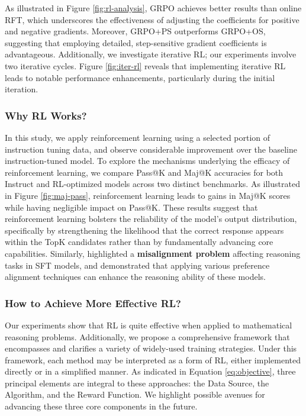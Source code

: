 \begin{itemize}[topsep=0pt]
As illustrated in Figure \ref{fig:rl-analysis}, GRPO achieves better results than online RFT, which underscores the effectiveness of adjusting the coefficients for positive and negative gradients. Moreover, GRPO+PS outperforms GRPO+OS, suggesting that employing detailed, step-sensitive gradient coefficients is advantageous. Additionally, we investigate iterative RL; our experiments involve two iterative cycles. Figure \ref{fig:iter-rl} reveals that implementing iterative RL leads to notable performance enhancements, particularly during the initial iteration.

\subsubsection{Why RL Works?} In this study, we apply reinforcement learning using a selected portion of instruction tuning data, and observe considerable improvement over the baseline instruction-tuned model. To explore the mechanisms underlying the efficacy of reinforcement learning, we compare Pass@K and Maj@K accuracies for both Instruct and RL-optimized models across two distinct benchmarks. As illustrated in Figure \ref{fig:maj-pass}, reinforcement learning leads to gains in Maj@K scores while having negligible impact on Pass@K. These results suggest that reinforcement learning bolsters the reliability of the model’s output distribution, specifically by strengthening the likelihood that the correct response appears within the TopK candidates rather than by fundamentally advancing core capabilities. Similarly, \citep{wang2023making} highlighted a \textbf{misalignment problem} affecting reasoning tasks in SFT models, and demonstrated that applying various preference alignment techniques \citep{yuan2023rrhf,song2023preference,wang2023making} can enhance the reasoning ability of these models.

\subsubsection{How to Achieve More Effective RL?}
\label{sec:effec_rl}
Our experiments show that RL is quite effective when applied to mathematical reasoning problems. Additionally, we propose a comprehensive framework that encompasses and clarifies a variety of widely-used training strategies. Under this framework, each method may be interpreted as a form of RL, either implemented directly or in a simplified manner. As indicated in Equation \ref{eq:objective}, three principal elements are integral to these approaches: the Data Source, the Algorithm, and the Reward Function. We highlight possible avenues for advancing these three core components in the future.


\end{itemize}
